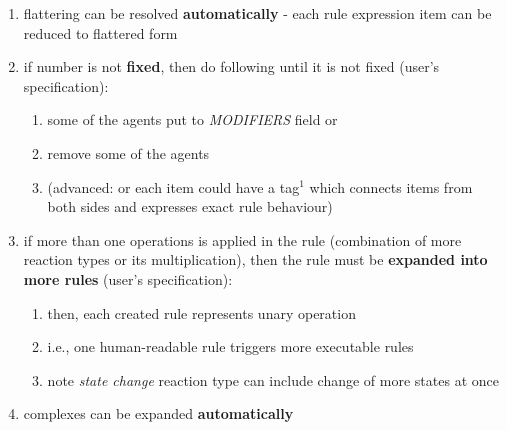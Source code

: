 \documentclass[12pt]{article}
\begin{document}
\begin{enumerate}
\item flattering can be resolved \textbf{automatically} - each rule expression item can be reduced to flattered form
\item if number is not \textbf{fixed}, then do following until it is not fixed (user's specification):
	\begin{enumerate}
		\item some of the agents put to \textit{MODIFIERS} field or
		\item remove some of the agents 
		\item (advanced: or each item could have a tag$^1$ which connects items from both sides and expresses exact rule behaviour)
	\end{enumerate}
\item if more than one operations is applied in the rule (combination of more reaction types or its multiplication), then the rule must be \textbf{expanded into more rules} (user's specification):
	\begin{enumerate}
		\item then, each created rule represents unary operation
		\item i.e., one human-readable rule triggers more executable rules
		\item note \textit{state change} reaction type can include change of more states at once
	\end{enumerate}
\item complexes can be expanded \textbf{automatically}
\end{enumerate}
\end{document}
